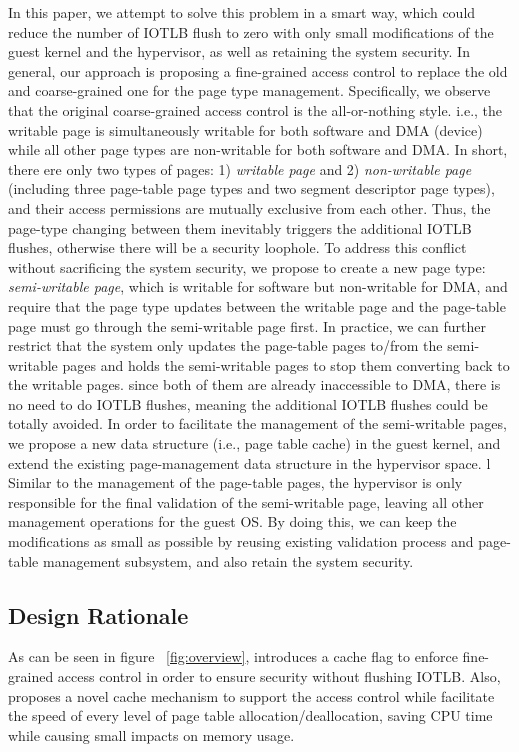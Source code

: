 In this paper, we attempt to solve this problem in a smart way, which could reduce the number of IOTLB flush to zero with only small modifications of the guest kernel and the hypervisor,
as well as retaining the system security.
In general, our approach is proposing a fine-grained access control to replace the old and coarse-grained one for the page type management.
Specifically, we observe that the original coarse-grained access control is the all-or-nothing style. i.e., the writable page is simultaneously writable for both software and DMA (device) while all other page types are non-writable for both software and DMA.
In short, there ere only two types of pages: 1) \emph{writable page} and 2) \emph{non-writable page} (including three page-table page types and two segment descriptor page types), and their access permissions are mutually exclusive from each other.
Thus, the page-type changing between them inevitably triggers the additional IOTLB flushes, otherwise there will be a security loophole.
To address this conflict without sacrificing the system security, we propose to create a new page type: \emph{semi-writable page}, which is writable for software but non-writable for DMA,
and require that the page type updates between the writable page and the page-table page must go through the semi-writable page first.
In practice,  we can further restrict that the system only updates the page-table pages to/from the semi-writable pages and holds the semi-writable pages to stop them converting back to the writable pages.
since both of them are already inaccessible to DMA, there is no need to do IOTLB flushes, meaning the additional IOTLB flushes could be totally avoided.
In order to facilitate the management of the semi-writable pages, we propose a new data structure (i.e., page table cache) in the guest kernel, and extend the existing page-management data structure in the hypervisor space.         l
Similar to the management of the page-table pages, the hypervisor is only responsible for the final validation of the semi-writable page, leaving all other management operations for the guest OS.
By doing this, we can keep the modifications as small as possible by reusing existing validation process and page-table management subsystem, and also retain the system security.


\subsection{Design Rationale}
As can be seen in figure ~\ref{fig:overview}, \name introduces a cache flag to enforce fine-grained access control in order to ensure security without flushing IOTLB. Also, \name proposes a novel cache mechanism to support the access control while facilitate the speed of every level of page table allocation/deallocation, saving CPU time while causing small impacts on memory usage.

